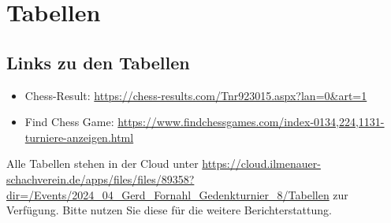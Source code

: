 \documentclass[a4paper,ngerman]{tui-algo-seminar}
\begin{document}
\clearpage
\section{Tabellen}
\subsection{Links zu den Tabellen}
\begin{itemize}
    \item Chess-Result: \url{https://chess-results.com/Tnr923015.aspx?lan=0&art=1}
    \item Find Chess Game: \url{https://www.findchessgames.com/index-0134,224,1131-turniere-anzeigen.html}
\end{itemize}


Alle Tabellen stehen in der Cloud unter \url{https://cloud.ilmenauer-schachverein.de/apps/files/files/89358?dir=/Events/2024_04_Gerd_Fornahl_Gedenkturnier_8/Tabellen} zur Verfügung. Bitte nutzen Sie diese für die weitere Berichterstattung. 
\end{document}
